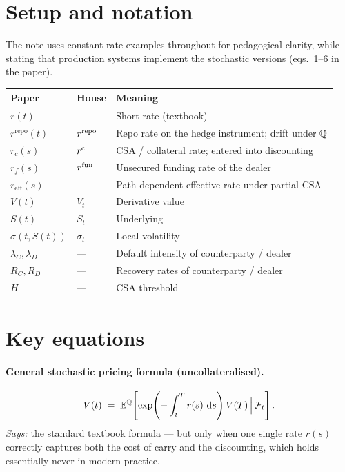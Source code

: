 \documentclass[11pt,a4paper]{article}
\begin{document}
\section{Setup and notation}

The note uses constant-rate examples throughout for pedagogical
clarity, while stating that production systems implement the
stochastic versions (eqs.~1--6 in the paper).

\begin{tabular}{@{}p{3cm}p{3.5cm}p{8.5cm}@{}}
\toprule
Paper            & House                  & Meaning \\
\midrule
$r(t)$           & ---                     & Short rate (textbook) \\
$r^{\text{repo}}(t)$ & $r^{\mathrm{repo}}$             & Repo rate on the hedge instrument; drift under $\mathbb{Q}$ \\
$r_c(s)$         & $r^{\mathrm{c}}$                 & CSA / collateral rate; entered into discounting \\
$r_f(s)$         & $r^{\mathrm{fun}}$                 & Unsecured funding rate of the dealer \\
$r_{\text{eff}}(s)$ & ---                  & Path-dependent effective rate under partial CSA \\
$V(t)$           & $V_t$                   & Derivative value \\
$S(t)$           & $S_t$                   & Underlying \\
$\sigma(t, S(t))$& $\sigma_t$              & Local volatility \\
$\lambda_C, \lambda_D$ & ---               & Default intensity of counterparty / dealer \\
$R_C, R_D$       & ---                     & Recovery rates of counterparty / dealer \\
$H$              & ---                     & CSA threshold \\
\bottomrule
\end{tabular}

\section{Key equations}

\paragraph{General stochastic pricing formula (uncollateralised).}
\begin{equation}\label{eq:general-pricing}
  V(t) \;=\; \mathbb{E}^{\mathbb{Q}}\!\left[ \exp\!\left(-\int_t^T r(s)\,\,\mathrm{d} s\right) V(T) \,\Big|\, \mathcal{F}_{t} \right].
\end{equation}
\textit{Says:} the standard textbook formula --- but only when one
single rate $r(s)$ correctly captures both the cost of carry and the
discounting, which holds essentially never in modern practice.
\end{document}
